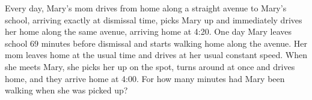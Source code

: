 Every day, Mary's mom drives from home along a straight avenue to Mary's school, arriving exactly at dismissal time, picks Mary up and immediately drives her home along the same avenue, arriving home at 4:20. One day Mary leaves school $69$ minutes before dismissal and starts walking home along the avenue. Her mom leaves home at the usual time and drives at her usual constant speed. When she meets Mary, she picks her up on the spot, turns around at once and drives home, and they arrive home at 4:00. For how many minutes had Mary been walking when she was picked up?
